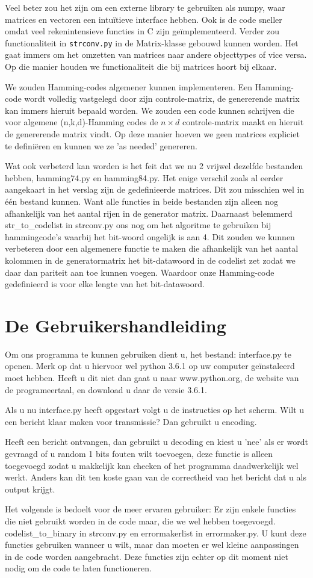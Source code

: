 \documentclass[a4paper]{article}
\begin{document}
Veel beter zou het zijn om een externe library te gebruiken als numpy, waar matrices en vectoren een intuïtieve interface hebben. Ook is de code sneller omdat veel rekenintensieve functies in C zijn geïmplementeerd. Verder zou functionaliteit in \texttt{strconv.py} in de Matrix-klasse gebouwd kunnen worden. Het gaat immers om het omzetten van matrices naar andere objecttypes of vice versa. Op die manier houden we functionaliteit die bij matrices hoort bij elkaar.

We zouden Hamming-codes algemener kunnen implementeren. Een Hamming-code wordt volledig vastgelegd door zijn controle-matrix, de genererende matrix kan immers hieruit bepaald worden. We zouden een code kunnen schrijven die voor algemene (n,k,d)-Hamming codes de \(n \times d\) controle-matrix maakt en hieruit de genererende matrix vindt. Op deze manier hoeven we geen matrices expliciet te definiëren en kunnen we ze 'as needed' genereren.

Wat ook verbeterd kan worden is het feit dat we nu 2 vrijwel dezelfde bestanden hebben, hamming74.py en hamming84.py. Het enige verschil zoals al eerder aangekaart in het verslag zijn de gedefinieerde matrices. Dit zou misschien wel in \'e\'en bestand kunnen. Want alle functies in beide bestanden zijn alleen nog afhankelijk van het aantal rijen in de generator matrix. Daarnaast belemmerd str\_to\_codelist in strconv.py ons nog om het algoritme te gebruiken bij hammingcode's waarbij het bit-woord ongelijk is aan 4. Dit zouden we kunnen verbeteren door een algemenere functie te maken die afhankelijk van het aantal kolommen in de generatormatrix het bit-datawoord in de codelist zet zodat we daar dan pariteit aan toe kunnen voegen. Waardoor onze Hamming-code gedefinieerd is voor elke lengte van het bit-datawoord.

\section{De Gebruikershandleiding}
Om ons programma te kunnen gebruiken dient u, het bestand: interface.py te openen. Merk op dat u hiervoor wel python 3.6.1 op uw computer ge\"instaleerd moet hebben. Heeft u dit niet dan gaat u naar www.python.org, de website van de programeertaal, en download u daar de versie 3.6.1.

Als u nu interface.py heeft opgestart volgt u de instructies op het scherm. Wilt u een bericht klaar maken voor transmissie? Dan gebruikt u encoding.

Heeft een bericht ontvangen, dan gebruikt u decoding en kiest u 'nee' als er wordt gevraagd of u random 1 bits fouten wilt toevoegen, deze functie is alleen toegevoegd zodat u makkelijk kan checken of het programma daadwerkelijk wel werkt. Anders kan dit ten koste gaan van de correctheid van het bericht dat u als output krijgt.

Het volgende is bedoelt voor de meer ervaren gebruiker:
Er zijn enkele functies die niet gebruikt worden in de code maar, die we wel hebben toegevoegd. codelist\_to\_binary in strconv.py en errormakerlist in errormaker.py. U kunt deze functies gebruiken wanneer u wilt, maar dan moeten er wel kleine aanpassingen in de code worden aangebracht. Deze functies zijn echter op dit moment niet nodig om de code te laten functioneren.
\end{document}
